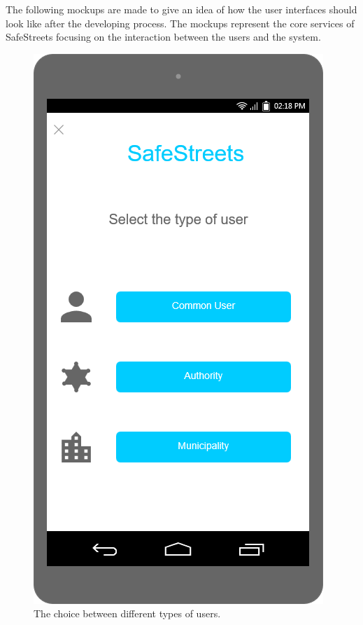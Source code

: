 \documentclass[a4paper]{article}
\newcommand{\mockupheight}{0.4\textheight}
\begin{document}
The following mockups are made to give an idea of how the user
interfaces should look like after the developing process. The mockups
represent the core services of SafeStreets focusing on the interaction
between the users and the system.
\bigskip\bigskip
\begin{figure}[H]
\centering
\includegraphics[height=\mockupheight]{mockup/choose_user}
\caption{The choice between different types of users.}
\end{figure}
\end{document}
